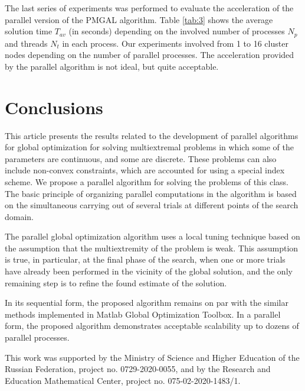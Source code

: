 \documentclass[
11pt,%
tightenlines,%
twoside,%
onecolumn,%
nofloats,%
nobibnotes,%
nofootinbib,%
superscriptaddress,%
noshowpacs,%
centertags]%
{revtex4}
\begin{document}
The last series of experiments was performed to evaluate the acceleration of the parallel version of the PMGAL algorithm. 
Table \ref{tab:3} shows the average solution time  $T_{av}$ (in seconds) depending on the involved number of processes $N_{p}$ and threads $N_{t}$ in each process. Our experiments involved from 1 to 16 cluster nodes depending on the number of parallel processes. 
The acceleration provided by the parallel algorithm is not ideal, but quite acceptable.



\section{Conclusions}

This article presents the results related to the development of parallel algorithms for global optimization for solving multiextremal problems in which some of the parameters are continuous, and some are discrete. 
These problems can also include non-convex constraints, which are accounted for using a special index scheme.
We propose a parallel algorithm for solving the problems of this class. The basic principle of organizing parallel computations in the algorithm is based on the simultaneous carrying out of several trials at different points of the search domain.

The parallel global optimization algorithm uses a local tuning technique based on the assumption that the multiextremity of the problem is weak. This assumption is true, in particular, at the final phase of the search, when one or more trials have already been performed in the vicinity of the global solution, and the only remaining step is to refine the found estimate of the solution.

In its sequential form, the proposed algorithm remains on par with the similar methods implemented in Matlab Global Optimization Toolbox. 
In a parallel form, the proposed algorithm demonstrates acceptable scalability up to dozens of parallel processes.
 


\begin{acknowledgments}
This work was supported by the Ministry of Science and Higher Education of the Russian Federation, project no. 0729-2020-0055, and by the Research and Education Mathematical Center, project no. 075-02-2020-1483/1.
\end{acknowledgments}


%
%
\end{document}
